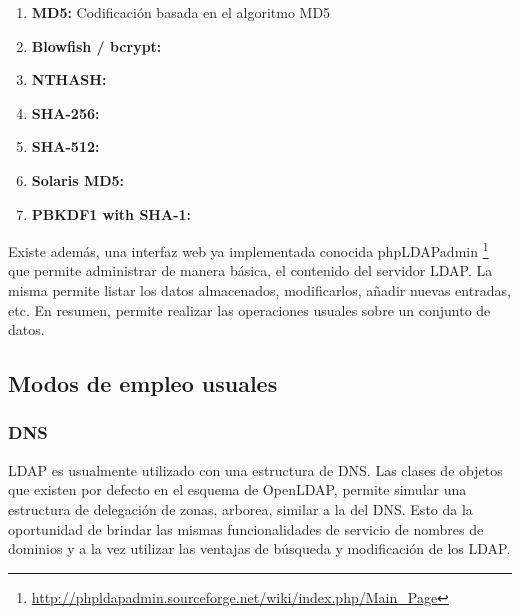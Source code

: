 \begin{enumerate}
	\item {\bf MD5:} Codificación basada en el algoritmo MD5
	\item {\bf 	Blowfish / bcrypt:} 
	\item {\bf NTHASH:} 
	\item {\bf SHA-256:} 
	\item {\bf SHA-512:} 
	\item {\bf Solaris MD5:} 
	\item {\bf PBKDF1 with SHA-1:} 
\end{enumerate}

Existe además, una interfaz web ya implementada conocida phpLDAPadmin \footnote{ 
\url{http://phpldapadmin.sourceforge.net/wiki/index.php/Main_Page}} que permite administrar 
de manera básica, el contenido del servidor LDAP. La misma permite listar los datos 
almacenados, modificarlos, añadir nuevas entradas, etc. En resumen, permite realizar las 
operaciones usuales sobre un conjunto de datos.

\subsection{Modos de empleo usuales}
\subsubsection{DNS}
LDAP es usualmente utilizado con una estructura de DNS. Las clases de objetos que existen por 
defecto en el esquema de OpenLDAP, permite simular una estructura de delegación de zonas, 
arborea, similar a la del DNS. Esto da la oportunidad de brindar las mismas funcionalidades 
de servicio de nombres de dominios y a la vez utilizar las ventajas de búsqueda y modificación 
de los LDAP.

